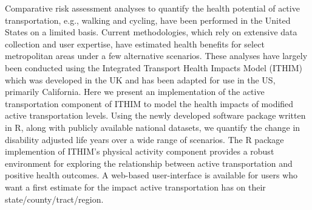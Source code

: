 Comparative risk assessment analyses to quantify the health potential
of active transportation, e.g., walking and cycling, have been
performed in the United States on a limited basis. Current
methodologies, which rely on extensive data collection and user
expertise, have estimated health benefits for select metropolitan
areas under a few alternative scenarios. These analyses have largely
been conducted using the Integrated Transport Health Impacts Model
(ITHIM) which was developed in the UK and has been adapted for use in
the US, primarily California. Here we present an implementation of the
active transportation component of ITHIM to model the health impacts
of modified active transportation levels. Using the newly developed
software package \package{} written in R, along with publicly
available national datasets, we quantify the change in disability
adjusted life years over a wide range of scenarios.  The R package
implemention of ITHIM's physical activity component provides a robust
environment for exploring the relationship between active
transportation and positive health outcomes.  A web-based
user-interface is available for users who want a first estimate for
the impact active transportation has on their
state/county/tract/region.

